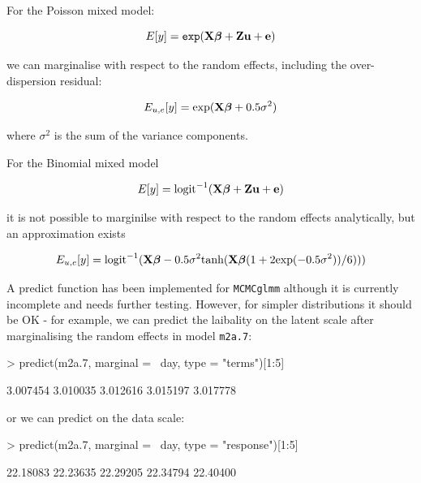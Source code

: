 \documentclass{article}
\begin{document}
For the Poisson mixed model:

\begin{equation}
E[y] = \texttt{exp}({\bf X}{\bm \beta}+{\bf Z}{\bf u}+{\bf e})
\end{equation}

we can marginalise with respect to the random effects, including the over-dispersion residual:

\begin{equation}
E_{{u,e}}[y] = \textrm{exp}({\bf X}{\bm \beta}+0.5\sigma^{2})
\end{equation}

where $\sigma^{2}$ is the sum of the variance components.

For the Binomial mixed model

\begin{equation}
E[y] = \textrm{logit}^{-1}({\bf X}{\bm \beta}+{\bf Z}{\bf u}+{\bf e})
\end{equation}

it is not possible to marginilse with respect to the random effects analytically, but an approximation exists \citep[][p452]{McCulloch.2001}

\begin{equation}
E_{{u,e}}[y] = \textrm{logit}^{-1}({\bf X}{\bm \beta}-0.5\sigma^{2}\textrm{tanh}({\bf X}{\bm \beta}(1+2\textrm{exp}(-0.5\sigma^{2}))/6)))
\end{equation}

A predict function has been implemented for \texttt{MCMCglmm} although it is currently incomplete and needs further testing. However, for simpler distributions it should be OK - for example, we can predict the laibality on the latent scale after marginalising the random effects in model \texttt{m2a.7}:

\begin{Schunk}
\begin{Sinput}
> predict(m2a.7, marginal = ~day, type = "terms")[1:5]
\end{Sinput}
\begin{Soutput}
[1] 3.007454 3.010035 3.012616 3.015197 3.017778
\end{Soutput}
\end{Schunk}

or we can predict on the data scale:

\begin{Schunk}
\begin{Sinput}
> predict(m2a.7, marginal = ~day, type = "response")[1:5]
\end{Sinput}
\begin{Soutput}
[1] 22.18083 22.23635 22.29205 22.34794 22.40400
\end{Soutput}
\end{Schunk}
\end{document}
